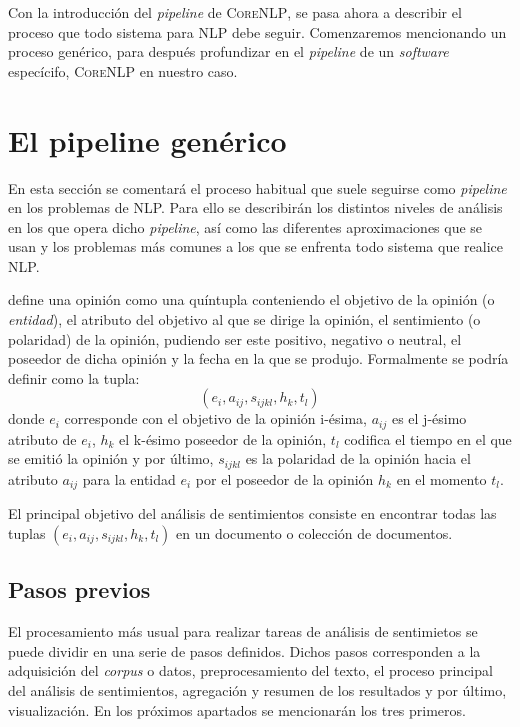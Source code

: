 Con la introducción del \emph{pipeline} de \textsc{CoreNLP}, se pasa ahora a
describir el proceso que todo sistema para \ac{NLP} debe seguir. Comenzaremos
mencionando un proceso genérico, para después profundizar en el \emph{pipeline}
de un \emph{software} especícifo, \textsc{CoreNLP} en nuestro caso.

\section{El pipeline genérico}
\label{sec:genericpipeline}

En esta sección se comentará el proceso habitual que suele seguirse como
\emph{pipeline} en los problemas de \ac{NLP}. Para ello se describirán los
distintos niveles de análisis en los que opera dicho \emph{pipeline}, así como
las diferentes aproximaciones que se usan y los problemas más comunes a los que
se enfrenta todo sistema que realice \ac{NLP}.

\citet{liu:2010} define una opinión como una quíntupla conteniendo el objetivo
de la opinión (o \emph{entidad}), el atributo del objetivo al que se dirige la
opinión, el sentimiento (o polaridad) de la opinión, pudiendo ser este positivo,
negativo o neutral, el poseedor de dicha opinión y la fecha en la que se
produjo. Formalmente se podría definir como la tupla:
\[
  (e_i, a_{ij}, s_{ijkl}, h_k, t_l)
\]
donde $e_i$ corresponde con el objetivo de la opinión i-ésima, $a_{ij}$ es el
j-ésimo atributo de $e_i$, $h_k$ el k-ésimo poseedor de la opinión, $t_l$
codifica el tiempo en el que se emitió la opinión y por último, $s_{ijkl}$ es la
polaridad de la opinión hacia el atributo $a_{ij}$ para la entidad $e_i$ por el
poseedor de la opinión $h_k$ en el momento $t_l$.

El principal objetivo del análisis de sentimientos consiste en encontrar todas
las tuplas $(e_i, a_{ij}, s_{ijkl}, h_k, t_l)$ en un documento o colección de
documentos.

\subsection{Pasos previos}
\label{subsec:previousSteps}

El procesamiento más usual para realizar tareas de análisis de sentimietos se
puede dividir en una serie de pasos definidos. Dichos pasos corresponden a la
adquisición del \emph{corpus} o datos, preprocesamiento del texto, el proceso
principal del análisis de sentimientos, agregación y resumen de los resultados y
por último, visualización. En los próximos apartados se mencionarán los tres
primeros.

